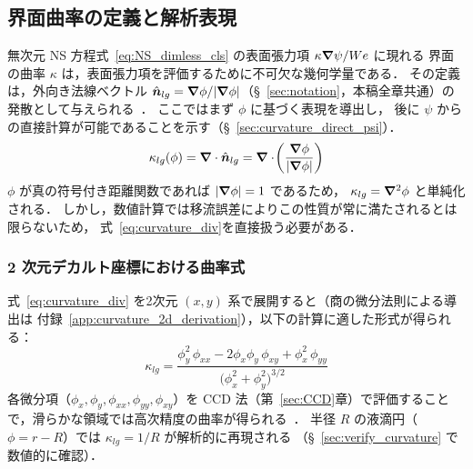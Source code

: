 \subsection{界面曲率の定義と解析表現}
\label{sec:curvature}

無次元 NS 方程式~\eqref{eq:NS_dimless_cls} の表面張力項 $\kappa\bm{\nabla}\psi/We$ に現れる
界面の曲率 $\kappa$ は，表面張力項を評価するために不可欠な幾何学量である．
その定義は，外向き法線ベクトル $\hat{\bm n}_{lg} = \bm{\nabla}\phi/|\bm{\nabla}\phi|$（§~\ref{sec:notation}，本稿全章共通）の発散として与えられる~\cite{OsherSethian1988}．
ここではまず $\phi$ に基づく表現を導出し，
後に $\psi$ からの直接計算が可能であることを示す（§~\ref{sec:curvature_direct_psi}）．
\begin{equation}
 \kappa_{lg}(\phi) = \bm{\nabla}\cdot \hat{\bm n}_{lg}
 = \bm{\nabla}\cdot\!\left(\frac{\bm{\nabla}\phi}{|\bm{\nabla}\phi|}\right)
 \label{eq:curvature_div}
\end{equation}
$\phi$ が真の符号付き距離関数であれば $|\bm{\nabla}\phi|=1$ であるため，
$\kappa_{lg} = \bm{\nabla}^2\phi$ と単純化される．
しかし，数値計算では移流誤差によりこの性質が常に満たされるとは限らないため，
式~\eqref{eq:curvature_div}を直接扱う必要がある．

\subsubsection{2 次元デカルト座標における曲率式}

式~\eqref{eq:curvature_div} を2次元 $(x,y)$ 系で展開すると（商の微分法則による導出は
付録~\ref{app:curvature_2d_derivation}），以下の計算に適した形式が得られる：
\begin{equation}
  \kappa_{lg} = \frac{
    \phi_y^2\,\phi_{xx}
    - 2\phi_x\phi_y\,\phi_{xy}
    + \phi_x^2\,\phi_{yy}
  }{\bigl(\phi_x^2 + \phi_y^2\bigr)^{3/2}}
  \label{eq:curvature_2d}
\end{equation}
各微分項（$\phi_x, \phi_y, \phi_{xx}, \phi_{yy}, \phi_{xy}$）を
CCD 法（第~\ref{sec:CCD}章）で評価することで，滑らかな領域では高次精度の曲率が得られる~\cite{MacklinLowengrub2006}．
半径 $R$ の液滴円（$\phi = r - R$）では $\kappa_{lg} = 1/R$ が解析的に再現される
（§~\ref{sec:verify_curvature} で数値的に確認）．


